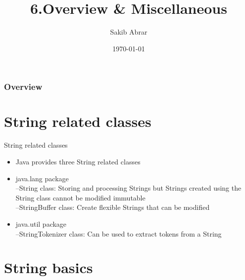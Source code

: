 \documentclass{beamer}
\title[Strings]{6.Overview \& Miscellaneous} %
\author{Sakib Abrar} %
\institute[BUET] %
{
CSE\\~\\Bangladesh University of Engineering \& Technology \\ %
\medskip
\textit{sakib.cghs@gmail.com} %
}
\date{\today} %
\begin{document}
\begin{frame}
\titlepage %
\end{frame}

\begin{frame}
\frametitle{Overview} %
\tableofcontents %
\end{frame}


\section{String related classes}


\begin{frame}[fragile]{String related classes}
\begin{itemize}
\item Java provides three String related classes
\item java.lang package\\
–String class: Storing and processing Strings but Strings
created using the String class cannot be modified
immutable\\
–StringBuffer class: Create flexible Strings that can be
modified\\
\item java.util package\\
–StringTokenizer class: Can be used to extract tokens from a
String
\end{itemize}
\end{frame}

\section{String basics}
\end{document}
